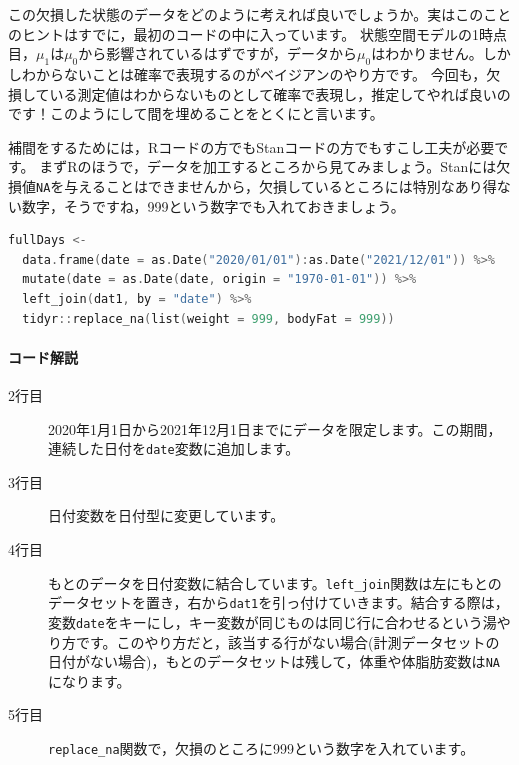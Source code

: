 \documentclass{ltjsbook}
\begin{document}
この欠損した状態のデータをどのように考えれば良いでしょうか。実はこのことのヒントはすでに，最初のコードの中に入っています。
状態空間モデルの1時点目，$\mu_1$は$\mu_0$から影響されているはずですが，データから$\mu_0$はわかりません。しかしわからないことは確率で表現するのがベイジアンのやり方です。
今回も，欠損している測定値はわからないものとして確率で表現し，推定してやれば良いのです！このようにして間を埋めることをとくにと言います。

補間をするためには，Rコードの方でもStanコードの方でもすこし工夫が必要です。
まずRのほうで，データを加工するところから見てみましょう。Stanには欠損値\verb|NA|を与えることはできませんから，欠損しているところには特別なあり得ない数字，そうですね，999という数字でも入れておきましょう。

\begin{lstlisting}[language=c++,label={code:29_03},caption={連続したデータを作り欠損値に借りの値を代入する}]
fullDays <- 
  data.frame(date = as.Date("2020/01/01"):as.Date("2021/12/01")) %>%
  mutate(date = as.Date(date, origin = "1970-01-01")) %>%
  left_join(dat1, by = "date") %>%
  tidyr::replace_na(list(weight = 999, bodyFat = 999))
\end{lstlisting}
\paragraph{コード解説}
\begin{description}
	\item[2行目] 2020年1月1日から2021年12月1日までにデータを限定します。この期間，連続した日付を\verb|date|変数に追加します。
	\item[3行目] 日付変数を日付型に変更しています。
	\item[4行目] もとのデータを日付変数に結合しています。\verb|left_join|関数は左にもとのデータセットを置き，右から\verb|dat1|を引っ付けていきます。結合する際は，変数\verb|date|をキーにし，キー変数が同じものは同じ行に合わせるという湯やり方です。このやり方だと，該当する行がない場合(計測データセットの日付がない場合)，もとのデータセットは残して，体重や体脂肪変数は\verb|NA|になります。
	\item[5行目] \verb|replace_na|関数で，欠損のところに999という数字を入れています。
\end{description}
\end{document}
